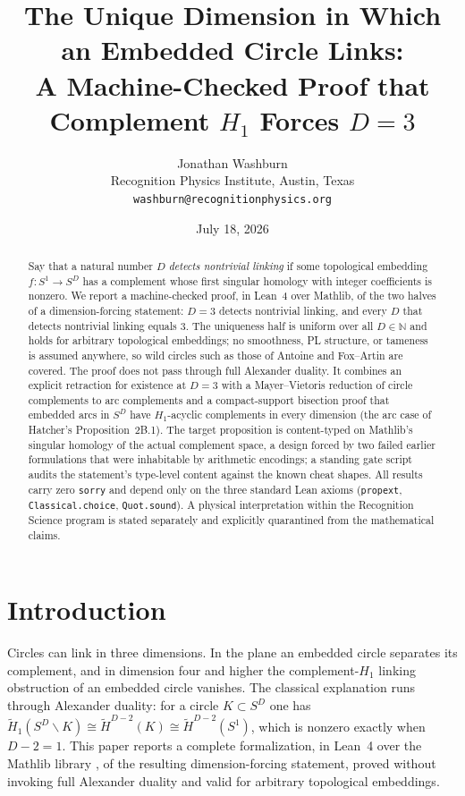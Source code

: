 \documentclass[11pt]{article}
\title{The Unique Dimension in Which an Embedded Circle Links:\\
A Machine-Checked Proof that Complement $H_1$ Forces $D=3$}
\author{Jonathan Washburn\\
\small Recognition Physics Institute, Austin, Texas\\
\small \texttt{washburn@recognitionphysics.org}}
\date{July 18, 2026}
\theoremstyle{definition}
\newcommand{\N}{\mathbb{N}}
\newcommand{\Sph}[1]{S^{#1}}
\newcommand{\lean}[1]{\texttt{#1}}
\begin{document}
\maketitle

\begin{abstract}
Say that a natural number $D$ \emph{detects nontrivial linking} if some topological embedding $f\colon S^1 \to S^D$ has a complement whose first singular homology with integer coefficients is nonzero. We report a machine-checked proof, in Lean~4 over Mathlib, of the two halves of a dimension-forcing statement: $D=3$ detects nontrivial linking, and every $D$ that detects nontrivial linking equals $3$. The uniqueness half is uniform over all $D \in \N$ and holds for arbitrary topological embeddings; no smoothness, PL structure, or tameness is assumed anywhere, so wild circles such as those of Antoine and Fox--Artin are covered. The proof does not pass through full Alexander duality. It combines an explicit retraction for existence at $D=3$ with a Mayer--Vietoris reduction of circle complements to arc complements and a compact-support bisection proof that embedded arcs in $\Sph{D}$ have $H_1$-acyclic complements in every dimension (the arc case of Hatcher's Proposition~2B.1). The target proposition is content-typed on Mathlib's singular homology of the actual complement space, a design forced by two failed earlier formulations that were inhabitable by arithmetic encodings; a standing gate script audits the statement's type-level content against the known cheat shapes. All results carry zero \lean{sorry} and depend only on the three standard Lean axioms (\lean{propext}, \lean{Classical.choice}, \lean{Quot.sound}). A physical interpretation within the Recognition Science program is stated separately and explicitly quarantined from the mathematical claims.
\end{abstract}

\section{Introduction}
\label{sec:intro}

Circles can link in three dimensions. In the plane an embedded circle separates its complement, and in dimension four and higher the complement-$H_1$ linking obstruction of an embedded circle vanishes. The classical explanation runs through Alexander duality: for a circle $K \subset \Sph{D}$ one has $\widetilde{H}_1(\Sph{D} \smallsetminus K) \cong \widetilde{H}^{D-2}(K) \cong \widetilde{H}^{D-2}(S^1)$, which is nonzero exactly when $D - 2 = 1$. This paper reports a complete formalization, in Lean~4 \cite{lean4} over the Mathlib library \cite{mathlib}, of the resulting dimension-forcing statement, proved without invoking full Alexander duality and valid for arbitrary topological embeddings.
\end{document}
